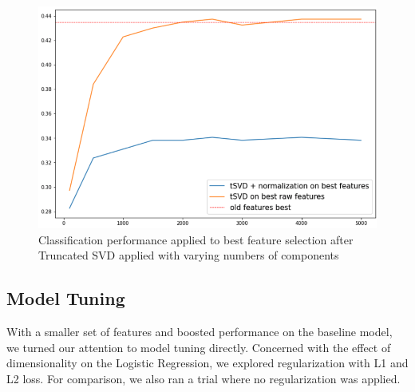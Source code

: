 \documentclass[11pt,a4paper]{article}
\begin{document}
\begin{figure}[htpb]
  \centering
  \includegraphics[width=1\linewidth]{imgs/tsvd.png}
  \caption{Classification performance applied to best feature
  selection after Truncated SVD applied with varying numbers of 
 components}%
  \label{fig:tsvd}
  \vspace{-10pt}
\end{figure}



\subsection{Model Tuning}%
\label{sub:model_tuning}


With a smaller set of features and boosted performance on the baseline model, we turned our attention to model tuning directly. Concerned with the effect of dimensionality on the Logistic Regression, we explored regularization with L1 and L2 loss. For comparison, we also ran a trial where no regularization was applied.
\end{document}
